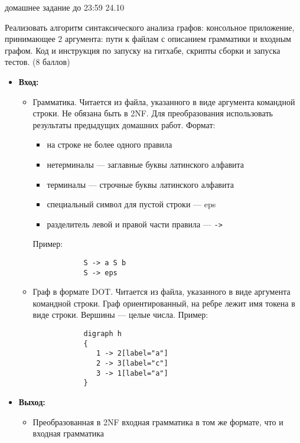 \documentclass[12pt]{article}
\begin{document}

{\Large домашнее задание до 23:59 24.10}
\bigskip

\enumerate
{
  \item
  
    Реализовать алгоритм синтаксического анализа графов: консольное приложение, принимающее 2 аргумента: пути к файлам с описанием грамматики и входным графом. Код и инструкция по запуску на гитхабе, скрипты сборки и запуска тестов. (8 баллов)
    \begin{itemize}
        \item \textbf{Вход:}
        \begin{itemize}
            \item Грамматика. Читается из файла, указанного в виде аргумента командной строки. Не обязана быть в 2NF. Для преобразования использовать результаты предыдущих домашних работ. Формат: 
            \begin{itemize}
                \item на строке не более одного правила
                \item нетерминалы --- заглавные буквы латинского алфавита
                \item терминалы --- строчные буквы латинского алфавита
                \item специальный символ для пустой строки --- eps
                \item разделитель левой и правой части правила --- \verb|->|
            \end{itemize}
            Пример:
            \begin{verbatim}
            S -> a S b
            S -> eps 
            \end{verbatim}
            \item Граф в формате DOT. Читается из файла, указанного в виде аргумента командной строки. Граф ориентированный, на ребре лежит имя токена в виде строки. Вершины --- целые числа. Пример:
            \begin{verbatim}
            digraph h
            {
               1 -> 2[label="a"]
               2 -> 3[label="c"]
               3 -> 1[label="a"]
            }
            \end{verbatim}
        \end{itemize}
        \item \textbf{Выход:} 
        \begin{itemize}
            \item Преобразованная в 2NF входная грамматика в том же формате, что и входная грамматика

\end{itemize}
\end{itemize}}
\end{document}
